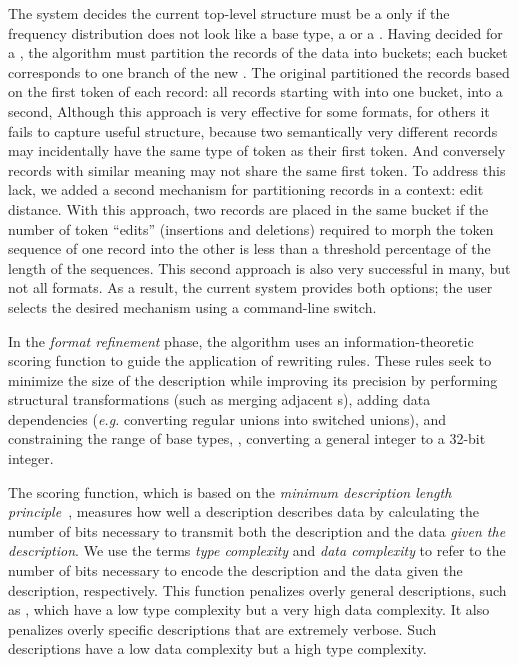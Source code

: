 The \learnpads{} system decides the current top-level structure must
be a  only if the frequency distribution does not look like
a base type, a  or a .  Having decided for a
, the algorithm must partition the records of the data into
buckets; each bucket corresponds to one branch of the new
.  The original \learnpads{} partitioned the records
based on the first token of each record: all records starting with
 into one bucket,  into a second, \etc{}  
Although this approach is very effective for some formats, for others
it fails to capture useful structure, because two semantically very
different records may incidentally have the same type of token as their first
token. And conversely records with similar meaning may not share the same
first token. To address this lack, we added
a second mechanism for partitioning records in a 
context: edit distance.  With this approach, two records are placed in
the same bucket if the number of token ``edits'' (insertions and
deletions) required to morph the token sequence of one record into the
other is less than a threshold percentage of the length of the
sequences.   This second approach is also very successful in many, but
not all formats.  As a result, the current \learnpads{} system
provides both options; the user selects the desired mechanism using a
command-line switch.


In the {\em format refinement} phase,
the algorithm uses an information-theoretic scoring function to guide the
application of rewriting rules.
These rules seek to minimize the size of the description while
improving its precision by performing structural transformations (such
as merging adjacent s),  adding data dependencies ({\em e.g.}
converting regular unions into switched unions), and
constraining the range of base types, \eg{}, converting a
general integer to a 32-bit integer.  

The scoring function, which is based on the \textit{minimum
  description length principle}~\cite{mdlbook}, 
measures how well a description describes data by calculating
the number of bits necessary to transmit both the description and the
data \textit{given the description}.  We use the terms \textit{type complexity}
  and \textit{data complexity} to refer to the number of bits necessary to
encode the description and the data given the description,
respectively.  This function penalizes overly
general descriptions, such as , which have a
low type complexity but a very high data complexity.  It also
penalizes overly specific descriptions that are extremely verbose.
Such descriptions have a low data complexity but a high type 
complexity.

